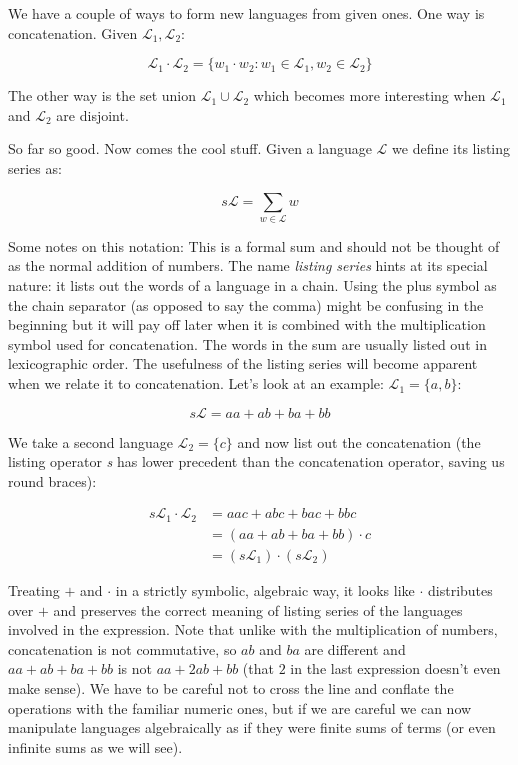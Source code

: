 We have a couple of ways to form new languages from given ones. One way is concatenation. Given $\mathcal{L}_1, \mathcal{L}_2$:

$$
\mathcal{L}_1 \cdot \mathcal{L}_2 = \{w_1 \cdot w_2: w_1 \in \mathcal{L}_1, w_2 \in \mathcal{L}_2\}
$$

The other way is the set union $\mathcal{L}_1 \cup \mathcal{L}_2$ which becomes more interesting when $\mathcal{L}_1$ and $\mathcal{L}_2$ are disjoint.

So far so good. Now comes the cool stuff. Given a language $\mathcal{L}$ we define its listing series as:

$$
s\mathcal{L} = \sum_{w \in \mathcal{L}} w
$$

Some notes on this notation: This is a formal sum and should not be thought of as the normal addition of numbers. The name \emph{listing series} hints at its special nature: it lists out the words of a language in a chain. Using the plus symbol as the chain separator (as opposed to say the comma) might be confusing in the beginning but it will pay off later when it is combined with the multiplication symbol used for concatenation. The words in the sum are usually listed out in lexicographic order. The usefulness of the listing series will become apparent when we relate it to concatenation. Let's look at an example: $\mathcal{L}_1 = \{a, b\}$:

$$
s\mathcal{L} = aa + ab + ba + bb
$$

We take a second language $\mathcal{L}_2 = \{c\}$ and now list out the concatenation (the listing operator \emph{s} has lower precedent than the concatenation operator, saving us round braces):

\begin{align*}
s \mathcal{L}_1 \cdot \mathcal{L}_2 &= aac + abc + bac + bbc \\
                                    &= (aa + ab + ba + bb) \cdot c \\
                                    &= (s \mathcal{L}_1) \cdot (s \mathcal{L}_2)
\end{align*}

Treating $+$ and $\cdot$ in a strictly symbolic, algebraic way, it looks like $\cdot$ distributes over $+$ and preserves the correct meaning of listing series of the languages involved in the expression. Note that unlike with the multiplication of numbers, concatenation is not commutative, so $ab$ and $ba$ are different and $aa + ab + ba + bb$ is not $aa + 2ab + bb$ (that $2$ in the last expression doesn't even make sense). We have to be careful not to cross the line and conflate the operations with the familiar numeric ones, but if we are careful we can now manipulate languages algebraically as if they were finite sums of terms (or even infinite sums as we will see).

